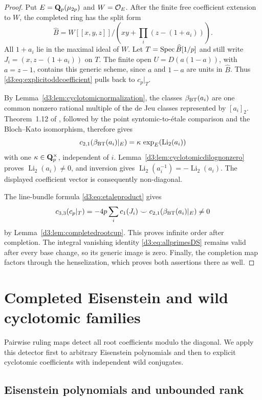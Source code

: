\begin{proof}
Put $E=\mathbf Q_p(\mu_{2p})$ and $W=\mathcal O_E$.
After the finite free coefficient extension to $W$, the completed
ring has the split form
\[
 \widehat B=
 W[[x,y,z]]\Big/\left(xy+\prod_i(z-(1+a_i))\right).
\]
All $1+a_i$ lie in the maximal ideal of $W$.
Let $T=\operatorname{Spec}\widehat B[1/p]$ and still write
$J_i=(x,z-(1+a_i))$ on $T$.
The finite open $U=D(a(1-a))$, with $a=z-1$, contains this generic
scheme, since $a$ and $1-a$ are units in $\widehat B$.
Thus \eqref{d3:eq:explicitoddcoefficient} pulls back to $c_p|_T$.

By Lemma~\ref{d3:lem:cyclotomicnormalization}, the classes
$\beta_{\rm BT}(a_i)$ are one common nonzero rational multiple of
the de Jeu classes represented by $[a_i]_2$.
Theorem~1.12 of \cite{BesserDeJeu}, followed by the point
syntomic-to-\'etale comparison and the Bloch--Kato isomorphism,
therefore gives
\[
 c_{2,1}(\beta_{\rm BT}(a_i)|_E)
   =\kappa\,\exp_E(\operatorname{Li}_2(a_i))
\]
with one $\kappa\in\mathbf Q_p^\times$, independent of $i$.
Lemma~\ref{d3:lem:cyclotomicdilognonzero} proves
$\operatorname{Li}_2(a_i)\ne0$, and inversion gives
$\operatorname{Li}_2(a_i^{-1})=-\operatorname{Li}_2(a_i)$.
The displayed coefficient vector is consequently non-diagonal.

The line-bundle formula \eqref{d3:eq:etaleproduct} gives
\[
 c_{3,3}(c_p|_T)
 =-4p\sum_i c_1(J_i)\smile
                c_{2,1}(\beta_{\rm BT}(a_i)|_E)\ne0
\]
by Lemma~\ref{d3:lem:completedrootcup}.
This proves infinite order after completion.
The integral vanishing identity \eqref{d3:eq:allprimesDS} remains
valid after every base change, so its generic image is zero.
Finally, the completion map factors through the henselization,
which proves both assertions there as well.
\end{proof}

\section{Completed Eisenstein and wild cyclotomic families}\label{d3:sec:completedfamilies}
Pairwise ruling maps detect all root coefficients modulo the diagonal.
We apply this detector first to arbitrary Eisenstein polynomials and
then to explicit cyclotomic coefficients with independent wild conjugates.

\subsection{Eisenstein polynomials and unbounded rank}
\label{d3:sec:completedarbitraryrank}\label{d3:sec:completedtamerank}

